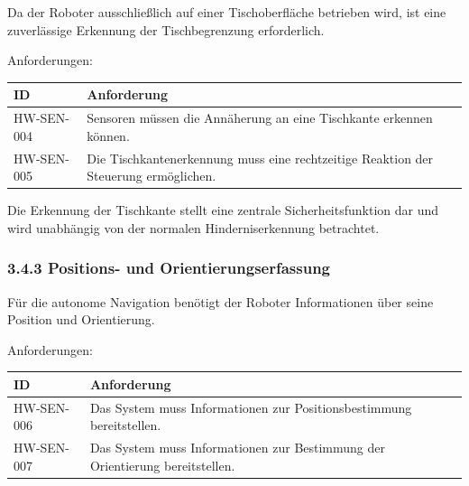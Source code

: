 \documentclass[
]{article}
\begin{document}
Da der Roboter ausschließlich auf einer Tischoberfläche betrieben wird,
ist eine zuverlässige Erkennung der Tischbegrenzung erforderlich.

Anforderungen:

\begin{longtable}[]{@{}
  >{\raggedright\arraybackslash}p{}
  >{\raggedright\arraybackslash}p{}@{}}
\toprule\noalign{}
\begin{minipage}[b]{\linewidth}\raggedright
ID
\end{minipage} & \begin{minipage}[b]{\linewidth}\raggedright
Anforderung
\end{minipage} \\
\midrule\noalign{}
\endhead
\bottomrule\noalign{}
\endlastfoot
HW-SEN-004 & Sensoren müssen die Annäherung an eine Tischkante erkennen
können. \\
HW-SEN-005 & Die Tischkantenerkennung muss eine rechtzeitige Reaktion
der Steuerung ermöglichen. \\
\end{longtable}

Die Erkennung der Tischkante stellt eine zentrale Sicherheitsfunktion
dar und wird unabhängig von der normalen Hinderniserkennung betrachtet.

\subsubsection{3.4.3 Positions- und
Orientierungserfassung}\label{positions--und-orientierungserfassung}

Für die autonome Navigation benötigt der Roboter Informationen über
seine Position und Orientierung.

Anforderungen:

\begin{longtable}[]{@{}
  >{\raggedright\arraybackslash}p{}
  >{\raggedright\arraybackslash}p{}@{}}
\toprule\noalign{}
\begin{minipage}[b]{\linewidth}\raggedright
ID
\end{minipage} & \begin{minipage}[b]{\linewidth}\raggedright
Anforderung
\end{minipage} \\
\midrule\noalign{}
\endhead
\bottomrule\noalign{}
\endlastfoot
HW-SEN-006 & Das System muss Informationen zur Positionsbestimmung
bereitstellen. \\
HW-SEN-007 & Das System muss Informationen zur Bestimmung der
Orientierung bereitstellen. \\
\end{longtable}
\end{document}
